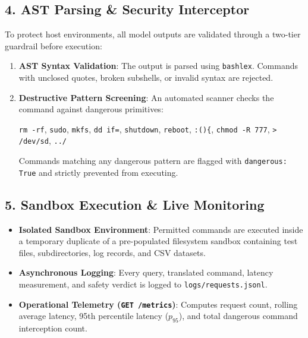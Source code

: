 \documentclass[11pt,a4paper]{report}
\begin{document}
\subsection{4. AST Parsing \& Security Interceptor}
To protect host environments, all model outputs are validated through a two-tier guardrail before execution:
\begin{enumerate}
    \item \textbf{AST Syntax Validation}: The output is parsed using \texttt{bashlex}. Commands with unclosed quotes, broken subshells, or invalid syntax are rejected.
    \item \textbf{Destructive Pattern Screening}: An automated scanner checks the command against dangerous primitives:
    \begin{center}
    \texttt{rm -rf}, \texttt{sudo}, \texttt{mkfs}, \texttt{dd if=}, \texttt{shutdown}, \texttt{reboot}, \texttt{:()\{}, \texttt{chmod -R 777}, \texttt{> /dev/sd}, \texttt{../}
    \end{center}
    Commands matching any dangerous pattern are flagged with \texttt{dangerous: True} and strictly prevented from executing.
\end{enumerate}

\subsection{5. Sandbox Execution \& Live Monitoring}
\begin{itemize}
    \item \textbf{Isolated Sandbox Environment}: Permitted commands are executed inside a temporary duplicate of a pre-populated filesystem sandbox containing test files, subdirectories, log records, and CSV datasets.
    \item \textbf{Asynchronous Logging}: Every query, translated command, latency measurement, and safety verdict is logged to \texttt{logs/requests.jsonl}.
    \item \textbf{Operational Telemetry (\texttt{GET /metrics})}: Computes request count, rolling average latency, 95th percentile latency ($p_{95}$), and total dangerous command interception count.
\end{itemize}
\end{document}
